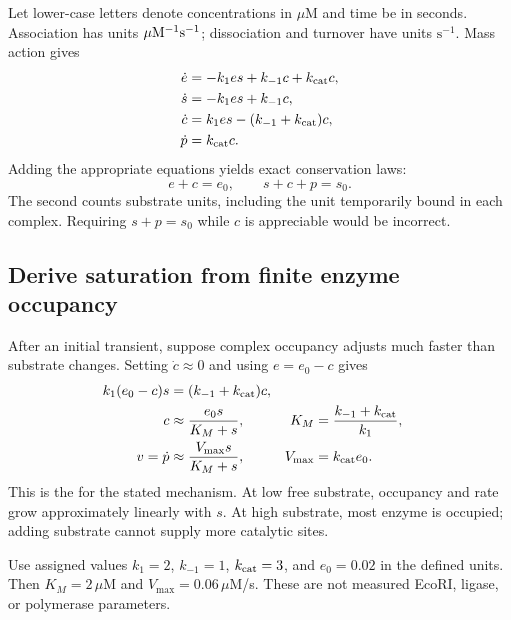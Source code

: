 Let lower-case letters denote concentrations in $\mu$M and time be in seconds. Association has units $\mu{\rm M}^{-1}{\rm s}^{-1}$; dissociation and turnover have units $\mathrm{s}^{-1}$. Mass action gives
\begin{align}
\dot e&=-k_1es+k_{-1}c+k_{\rm cat}c,\\
\dot s&=-k_1es+k_{-1}c,\\
\dot c&=k_1es-(k_{-1}+k_{\rm cat})c,\\
\dot p&=k_{\rm cat}c.
\label{eq:full}
\end{align}
Adding the appropriate equations yields exact conservation laws:
\begin{equation}
e+c=e_0,\qquad s+c+p=s_0.
\label{eq:conservation}
\end{equation}
The second counts substrate units, including the unit temporarily bound in each complex. Requiring $s+p=s_0$ while $c$ is appreciable would be incorrect.


\subsection{Derive saturation from finite enzyme occupancy}

After an initial transient, suppose complex occupancy adjusts much faster than substrate changes. Setting $\dot c\approx0$ and using $e=e_0-c$ gives
\begin{align}
k_1(e_0-c)s&=(k_{-1}+k_{\rm cat})c,\\
c&\approx\frac{e_0s}{K_M+s},
&K_M&=\frac{k_{-1}+k_{\rm cat}}{k_1},\\
v=\dot p&\approx\frac{V_{\max}s}{K_M+s},
&V_{\max}&=k_{\rm cat}e_0.
\label{eq:mm}
\end{align}
This is the  for the stated mechanism. At low free substrate, occupancy and rate grow approximately linearly with $s$. At high substrate, most enzyme is occupied; adding substrate cannot supply more catalytic sites.


Use assigned values $k_1=2$, $k_{-1}=1$, $k_{\rm cat}=3$, and $e_0=0.02$ in the defined units. Then $K_M=2\,\mu$M and $V_{\max}=0.06\,\mu$M/s. These are not measured EcoRI, ligase, or polymerase parameters.

\begin{center}\end{center}

